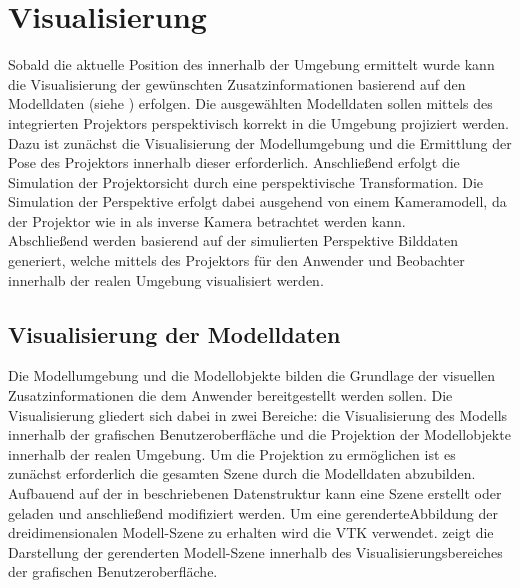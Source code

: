 \chapter{Visualisierung}
\label{chap.vis}

Sobald die aktuelle Position des  innerhalb der Umgebung ermittelt wurde kann die Visualisierung der gewünschten Zusatzinformationen basierend auf den Modelldaten (siehe ) erfolgen. Die ausgewählten Modelldaten sollen mittels des integrierten Projektors perspektivisch korrekt in die Umgebung projiziert werden. Dazu ist zunächst die Visualisierung der Modellumgebung und die Ermittlung der Pose des Projektors innerhalb dieser erforderlich. Anschließend erfolgt die Simulation der Projektorsicht durch eine perspektivische Transformation. Die Simulation der Perspektive erfolgt dabei ausgehend von einem Kameramodell, da der Projektor wie in  als inverse Kamera betrachtet werden kann.\\
Abschließend werden basierend auf der simulierten Perspektive Bilddaten generiert, welche mittels des Projektors für den Anwender und Beobachter innerhalb der realen Umgebung visualisiert werden.

\section{Visualisierung der Modelldaten}
Die Modellumgebung und die Modellobjekte bilden die Grundlage der visuellen Zusatzinformationen die dem Anwender bereitgestellt werden sollen. Die Visualisierung gliedert sich dabei in zwei Bereiche: die Visualisierung des Modells innerhalb der grafischen Benutzeroberfläche und die Projektion der Modellobjekte innerhalb der realen Umgebung. Um die Projektion zu ermöglichen ist es zunächst erforderlich die gesamten Szene durch die Modelldaten abzubilden. Aufbauend auf der in  beschriebenen Datenstruktur kann eine Szene erstellt oder geladen und anschließend modifiziert werden. Um eine gerenderte\red[footnote?] Abbildung der dreidimensionalen Modell-Szene zu erhalten wird die \red[Visualisierungsbibliothek] VTK verwendet.  zeigt die Darstellung der gerenderten Modell-Szene innerhalb des Visualisierungsbereiches der grafischen Benutzeroberfläche.


